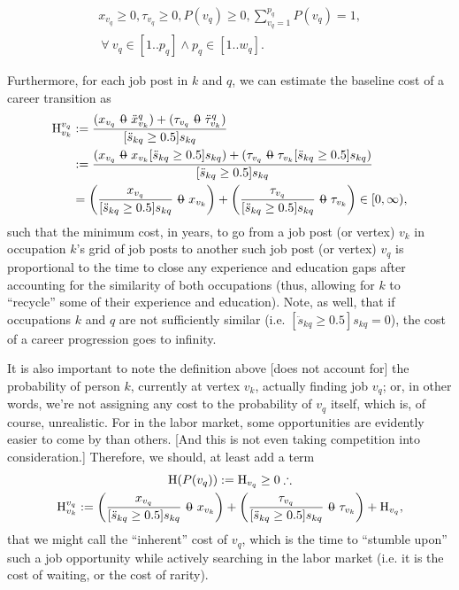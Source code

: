 \documentclass[12pt, a4paper]{article}
\makeatletter
\newcommand{\superimpose}[2]{{
  \ooalign{
    \hfil$\m@th#1\@firstoftwo#2$\hfil\cr
    \hfil$\m@th#1\@secondoftwo#2$\hfil\cr
  }
}}
\newcommand{\stack}[2]{\mathbin{\mathpalette\superimpose{{#1}{#2}}}}
\newcommand{\minuszero}{\stack{0}{-}}
\newcommand{\Eta}{\text{H}}
\makeatother
\begin{document}
\begin{gather}
  x_{v_q} \geq 0
  ,
  \tau_{v_q} \geq 0
  ,
  P(v_q) \geq 0
  ,
  \sum_{v_q=1}^{p_q} P(v_q) = 1
  , \\
  \
  \forall
  \
  v_q \in [1..p_q] \land p_q \in [1..w_q]
  .
\end{gather}

Furthermore, for each job post in $k$ and $q$, we can estimate the baseline
cost of a career transition as
\begin{align}
  \Eta_{v_k}^{v_q}
   & :=
  \frac{
    (x_{v_q} \minuszero \ddot{x}_{v_k}^{q})
    +
    (\tau_{v_q} \minuszero \ddot{\tau}_{v_k}^{q})
  }{
    [\ddot{s}_{kq} \geq 0.5] s_{kq}
  }
  \\
   & :=
  \frac{
    (x_{v_q} \minuszero x_{v_k} [\ddot{s}_{kq} \geq 0.5] s_{kq})
    +
    (\tau_{v_q} \minuszero \tau_{v_k} [\ddot{s}_{kq} \geq 0.5] s_{kq})
  }{
    [\ddot{s}_{kq} \geq 0.5] s_{kq}
  }
  \\
   & =
  \left(
  \frac{x_{v_q}}{[\ddot{s}_{kq} \geq 0.5] s_{kq}}
  \minuszero
  x_{v_k}
  \right)
  +
  \left(
  \frac{\tau_{v_q}}{[\ddot{s}_{kq} \geq 0.5] s_{kq}}
  \minuszero
  \tau_{v_k}
  \right)
  \in
  [0, \infty)
  ,
\end{align}
such that the minimum cost, in years, to go from a job post (or vertex) $v_k$
in occupation $k$'s grid of job posts to another such job post (or vertex) $v_q$
is proportional to the time to close any experience and education gaps after accounting for the similarity of both occupations (thus, allowing for $k$ to ``recycle'' some of their experience and education). Note, as well, that if occupations $k$ and $q$ are not sufficiently similar (i.e. $[\ddot{s}_{kq} \geq 0.5] s_{kq} = 0$), the cost of a career progression goes to infinity.

It is also important to note the definition above [does not account for] the
probability of person $k$, currently at vertex $v_k$, actually finding job
$v_q$; or, in other words, we're not assigning any cost to the probability of
$v_q$ itself, which is, of course, unrealistic. For in the labor market, some
opportunities are evidently easier to come by than others. [And this is not
    even taking competition into consideration.] Therefore, we should, at least add
a term
\begin{gather}
  \Eta(P(v_q))
  :=
  \Eta_{v_q}
  \geq 0
  \therefore
  \\
  \Eta_{v_k}^{v_q}
  :=
  \left(
  \frac{x_{v_q}}{[\ddot{s}_{kq} \geq 0.5] s_{kq}}
  \minuszero
  x_{v_k}
  \right)
  +
  \left(
  \frac{\tau_{v_q}}{[\ddot{s}_{kq} \geq 0.5] s_{kq}}
  \minuszero
  \tau_{v_k}
  \right)
  +
  \Eta_{v_q}
  ,
\end{gather}
that we might call the ``inherent'' cost of $v_q$, which is the time to ``stumble upon'' such a job opportunity while actively searching in the labor market (i.e. it is the cost of waiting, or the cost of rarity).
\end{document}
